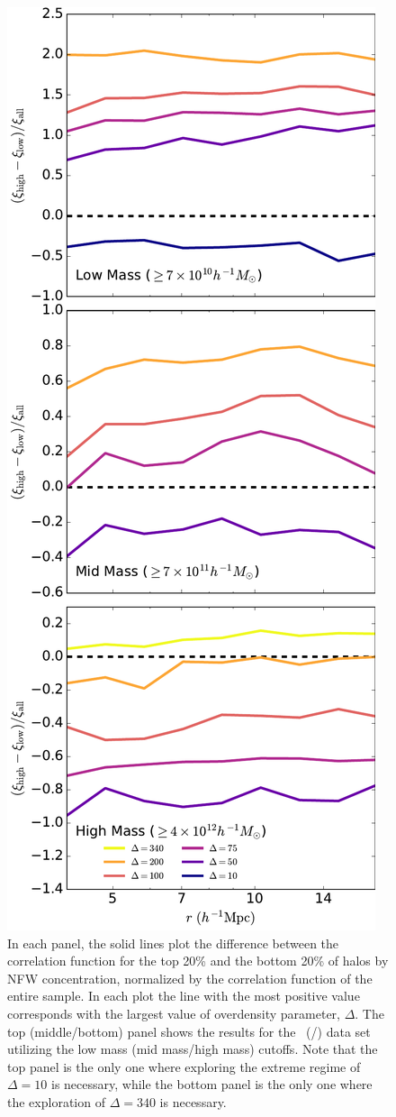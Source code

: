 \documentclass[usenatbib]{mnras}
\begin{document}
\begin{figure}
	\centering
	\includegraphics[width=.4\textwidth]{all_cfcompare_cnfw.pdf}
	\caption{
In each panel, the solid lines plot the difference between the correlation function for the top
20\% and the bottom 20\% of halos by NFW concentration, normalized by the
correlation function of the entire sample. In each plot the line with the most positive value
corresponds with the largest value of overdensity parameter, $\Delta$. 
The top (middle/bottom) panel shows the results for the \simA \ (\simB /\simC) data 
set utilizing the low mass (mid mass/high mass) cutoffs. Note
that the top panel is the only one where exploring the extreme regime of $\Delta = 10$ is
necessary, while the bottom panel is the only one where the exploration of $\Delta = 340$
is necessary.
}
\label{fig:cc_cfcompare}
\end{figure}
\end{document}
